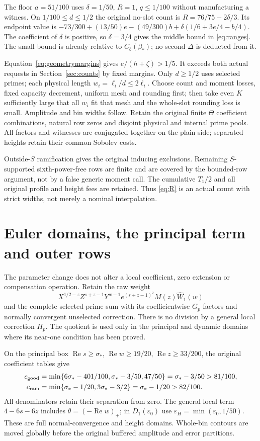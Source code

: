 \documentclass[11pt,a4paper]{article}
\theoremstyle{definition}
\newcommand{\Rea}{\operatorname{Re}}
\newcommand{\eps}{\varepsilon}
\newcommand{\bet}{\beta_*}
\newcommand{\sig}{\sigma_*}
\begin{document}
The floor $a=51/100$ uses $\delta=1/50$, $R=1$, $q\le1/100$
without manufacturing a witness. On $1/100\le d\le1/2$ the original
no-slot count is $R=76/75-2\delta/3$.
Its endpoint value is
$-73/300+(13/50)e-(49/300)b
 +\delta(1/6+3e/4-b/4)$.
The coefficient of $\delta$ is positive, so $\delta=3/4$
gives the middle bound in \eqref{eq:ranges}.
The small bound is already relative to $C_b(\bet)$; no second
$\Delta$ is deducted from it.

Equation~\eqref{eq:geometrymargins} gives
$e/(h+\zeta)>1/5$. It exceeds both actual requests in
Section~\ref{sec:counts} by fixed margins.
Only $d\ge1/2$ uses selected primes; each physical length
$w_i=\ell_i/d\le2\ell_i$.
Choose count and moment losses, fixed capacity decrement,
uniform mesh and rounding first; then take even $K$ sufficiently
large that all $w_i$ fit that mesh and the whole-slot rounding
loss is small. Amplitude and bin widths follow.
Retain the original finite $\Theta$ coefficient combinations,
natural row zeros and disjoint physical and internal prime pools.
All factors and witnesses are conjugated together on the plain
side; separated heights retain their common Sobolev costs.

Outside-$S$ ramification gives the original inducing exclusions.
Remaining $S$-supported sixth-power-free rows are finite and
are covered by the bounded-row argument, not by a false generic
moment call. The cumulative $T_1/2$ and all original profile
and height fees are retained.
Thus \eqref{eq:R} is an actual count with strict widths,
not merely a nominal interpolation.

\section{Euler domains, the principal term and outer rows}
\label{sec:contours}
The parameter change does not alter a local coefficient,
zero extension or compensation operation. Retain the raw weight
\[
 X^{1/2-z}Z^{s+z-1}Y^{w-1}e^{(s+z-1)^2}
                 M(z)\widehat W_1(w)
\]
and the complete selected-prime sum with its coefficientwise
$G_p$ factors and normally convergent unselected correction.
There is no division by a general local correction $H_p$.
The quotient is used only in the principal and dynamic domains
where its near-one condition has been proved.

On the principal box
$\Rea s\ge\sig$, $\Rea w\ge19/20$, $\Rea z\ge33/200$,
the original coefficient tables give
\[
\begin{split}
 c_{\rm good}
 &=\min\{6\sig-401/100,\sig-3/50,47/50\}
   =\sig-3/50>81/100,\\
 c_{\rm ram}
 &=\min\{\sig-1/20,3\sig-3/2\}
   =\sig-1/20>82/100 .
\end{split}
\]
All denominators retain their separation from zero.
The general local term $4-6s-6z$ includes
$\theta=(-\Rea w)_+$; in $D_1(\eps_0)$ use
$\eps_H=\min(\eps_0,1/50)$.
These are full normal-convergence and height domains.
Whole-bin contours are moved globally before the original
buffered amplitude and error partitions.
\end{document}
